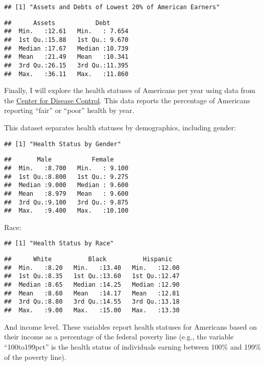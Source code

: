 \documentclass[
]{article}
\begin{document}
\begin{verbatim}
## [1] "Assets and Debts of Lowest 20% of American Earners"
\end{verbatim}

\begin{verbatim}
##      Assets           Debt       
##  Min.   :12.61   Min.   : 7.654  
##  1st Qu.:15.88   1st Qu.: 9.670  
##  Median :17.67   Median :10.739  
##  Mean   :21.49   Mean   :10.341  
##  3rd Qu.:26.15   3rd Qu.:11.395  
##  Max.   :36.11   Max.   :11.860
\end{verbatim}

Finally, I will explore the health statuses of Americans per year using
data from the
\href{https://www.cdc.gov/nchs/hus/topics/health-status.htm\#explore-data}{Center
for Disease Control}. This data reports the percentage of Americans
reporting ``fair'' or ``poor'' health by year.

This dataset separates health statuses by demographics, including
gender:

\begin{verbatim}
## [1] "Health Status by Gender"
\end{verbatim}

\begin{verbatim}
##       Male           Female      
##  Min.   :8.700   Min.   : 9.100  
##  1st Qu.:8.800   1st Qu.: 9.275  
##  Median :9.000   Median : 9.600  
##  Mean   :8.979   Mean   : 9.600  
##  3rd Qu.:9.100   3rd Qu.: 9.875  
##  Max.   :9.400   Max.   :10.100
\end{verbatim}

Race:

\begin{verbatim}
## [1] "Health Status by Race"
\end{verbatim}

\begin{verbatim}
##      White          Black          Hispanic    
##  Min.   :8.20   Min.   :13.40   Min.   :12.00  
##  1st Qu.:8.35   1st Qu.:13.60   1st Qu.:12.47  
##  Median :8.65   Median :14.25   Median :12.90  
##  Mean   :8.60   Mean   :14.17   Mean   :12.81  
##  3rd Qu.:8.80   3rd Qu.:14.55   3rd Qu.:13.18  
##  Max.   :9.00   Max.   :15.00   Max.   :13.30
\end{verbatim}

And income level. These variables report health statuses for Americans
based on their income as a percentage of the federal poverty line (e.g.,
the variable ``100to199pct'' is the health status of individuals earning
between 100\% and 199\% of the poverty line).
\end{document}
